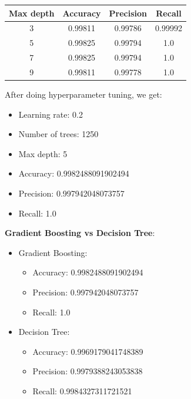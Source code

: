 \documentclass[12pt]{article}
\begin{document}
\begin{center}
    \begin{tabular}{|c|c|c|c|}
        \hline
        Max depth & Accuracy & Precision & Recall \\
        \hline
        3 & 0.99811 & 0.99786 & 0.99992 \\
        5 & 0.99825 & 0.99794 & 1.0 \\
        7 & 0.99825 & 0.99794 & 1.0 \\
        9 & 0.99811 & 0.99778 & 1.0 \\
        \hline
    \end{tabular}
\end{center}
After doing hyperparameter tuning, we get:
\begin{itemize}
    \item Learning rate: 0.2
    \item Number of trees: 1250
    \item Max depth: 5
    \item Accuracy: 0.9982488091902494
    \item Precision: 0.997942048073757
    \item Recall: 1.0
\end{itemize}
\textbf{Gradient Boosting vs Decision Tree}:
\begin{itemize}
    \item Gradient Boosting:
    \begin{itemize}
        \item Accuracy: 0.9982488091902494
        \item Precision: 0.997942048073757
        \item Recall: 1.0
    \end{itemize}
    \item Decision Tree:
    \begin{itemize}
        \item Accuracy: 0.9969179041748389
        \item Precision: 0.9979388243053838
        \item Recall: 0.9984327311721521
    \end{itemize}
\end{itemize}
   
\end{document}
